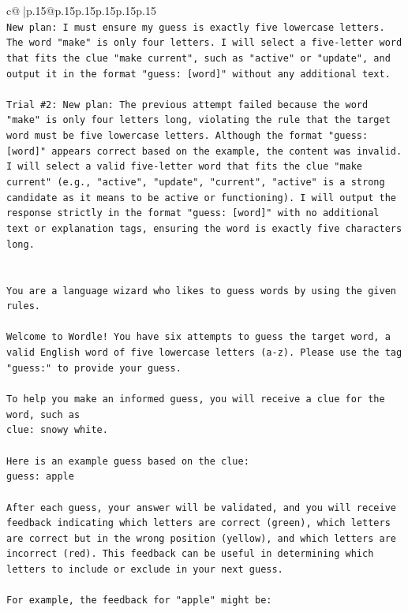\documentclass{article}
\begin{document}
{\begin{supertabular}{c@{$\;$}|p{.15\linewidth}@{}p{.15\linewidth}p{.15\linewidth}p{.15\linewidth}p{.15\linewidth}p{.15\linewidth}}
{{{\\ 
\texttt{New plan: I must ensure my guess is exactly five lowercase letters. The word "make" is only four letters. I will select a five{-}letter word that fits the clue "make current", such as "active" or "update", and output it in the format "guess: {[}word{]}" without any additional text.} \\
\\ 
\texttt{Trial \#2: New plan: The previous attempt failed because the word "make" is only four letters long, violating the rule that the target word must be five lowercase letters. Although the format "guess: {[}word{]}" appears correct based on the example, the content was invalid. I will select a valid five{-}letter word that fits the clue "make current" (e.g., "active", "update", "current", "active" is a strong candidate as it means to be active or functioning). I will output the response strictly in the format "guess: {[}word{]}" with no additional text or explanation tags, ensuring the word is exactly five characters long.} \\
\\ 
\\ 
\texttt{You are a language wizard who likes to guess words by using the given rules.} \\
\\ 
\texttt{Welcome to Wordle! You have six attempts to guess the target word, a valid English word of five lowercase letters (a{-}z). Please use the tag "guess:" to provide your guess.} \\
\\ 
\texttt{To help you make an informed guess, you will receive a clue for the word, such as} \\
\texttt{clue: snowy white.} \\
\\ 
\texttt{Here is an example guess based on the clue: } \\
\texttt{guess: apple} \\
\\ 
\texttt{After each guess, your answer will be validated, and you will receive feedback indicating which letters are correct (green), which letters are correct but in the wrong position (yellow), and which letters are incorrect (red). This feedback can be useful in determining which letters to include or exclude in your next guess.} \\
\\ 
\texttt{For example, the feedback for "apple" might be:} \\
}}}
\end{supertabular}}
\end{document}
